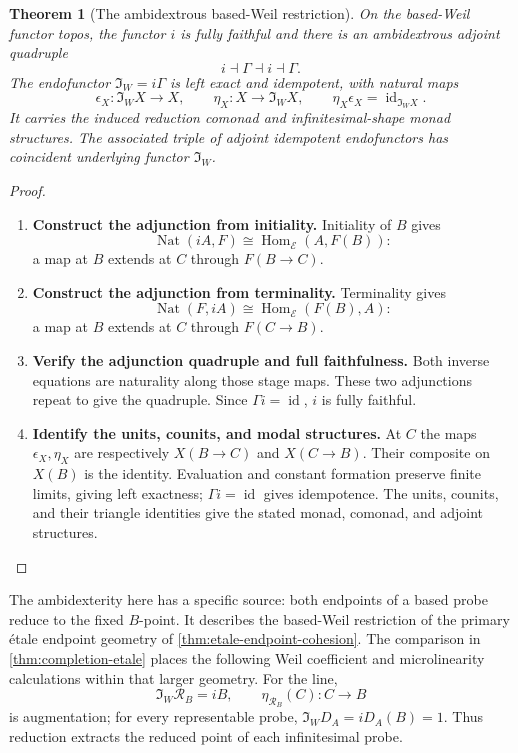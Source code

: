 \documentclass[11pt,a4paper]{article}
\numberwithin{algorithm}{section}
\numberwithin{equation}{section}
\newtheorem{theorem}{Theorem}[section]
\theoremstyle{definition}
\theoremstyle{remark}
\theoremstyle{plain}
\newcommand{\E}{\mathcal E}
\newcommand{\id}{\operatorname{id}}
\newcommand{\Hom}{\operatorname{Hom}}
\newcommand{\Rline}{\mathcal R_B}
\newcommand{\Shape}{\mathfrak I_W}
\theoremstyle{definition}
\theoremstyle{plain}
\begin{document}
\begin{theorem}[The ambidextrous based-Weil restriction]\label{thm:cohesion}
On the based-Weil functor topos, the functor $i$ is fully faithful
and there is an ambidextrous adjoint quadruple
\[
 i\dashv\Gamma\dashv i\dashv\Gamma.
\]
The endofunctor $\Shape=i\Gamma$ is left exact and idempotent,
with natural maps
\[
 \epsilon_X:\Shape X\to X,\qquad
 \eta_X:X\to\Shape X,\qquad
 \eta_X\epsilon_X=\id_{\Shape X}.
\]
It carries the induced reduction comonad and infinitesimal-shape
monad structures. The associated triple of adjoint idempotent
endofunctors has coincident underlying functor $\Shape$.
\end{theorem}
\begin{proof}\leavevmode
\begin{enumerate}[leftmargin=*,align=left]
\item \textbf{Construct the adjunction from initiality.}
Initiality of $B$ gives
\[
 \operatorname{Nat}(iA,F)\cong\Hom_{\E}(A,F(B)):
\]
a map at $B$ extends at $C$ through $F(B\to C)$.

\item \textbf{Construct the adjunction from terminality.}
Terminality gives
\[
 \operatorname{Nat}(F,iA)\cong\Hom_{\E}(F(B),A):
\]
a map at $B$ extends at $C$ through $F(C\to B)$.

\item \textbf{Verify the adjunction quadruple and full faithfulness.}
Both inverse equations are naturality along those stage maps.
These two adjunctions repeat to give the quadruple.
Since $\Gamma i=\id$, $i$ is fully faithful.

\item \textbf{Identify the units, counits, and modal structures.}
At $C$ the maps $\epsilon_X,\eta_X$ are respectively
$X(B\to C)$ and $X(C\to B)$. Their composite on $X(B)$
is the identity. Evaluation and constant formation preserve
finite limits, giving left exactness; $\Gamma i=\id$ gives
idempotence. The units, counits, and their triangle identities
give the stated monad, comonad, and adjoint structures.
\end{enumerate}
\end{proof}

The ambidexterity here has a specific source: both endpoints of a
based probe reduce to the fixed $B$-point. It describes the based-Weil
restriction of the primary \'etale endpoint geometry of
\cref{thm:etale-endpoint-cohesion}. The comparison in
\cref{thm:completion-etale} places the following Weil coefficient
and microlinearity calculations within that larger geometry.
For the line,
\[
 \Shape\Rline=iB,\qquad
 \eta_{\Rline}(C):C\to B
\]
is augmentation; for every representable probe, $\Shape D_A=iD_A(B)=1$.
Thus reduction extracts the reduced point of each infinitesimal probe.
\end{document}
